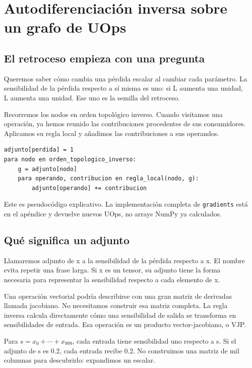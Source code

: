 \documentclass[12pt,a4paper,oneside]{report}
\begin{document}
\chapter{Autodiferenciación inversa sobre un grafo de UOps}
\label{ch:autodiff}
\section{El retroceso empieza con una pregunta}
Queremos saber cómo cambia una pérdida escalar al cambiar cada parámetro. La sensibilidad de la pérdida respecto a sí misma es uno: si L aumenta una unidad, L aumenta una unidad. Ese uno es la semilla del retroceso.

Recorremos los nodos en orden topológico inverso. Cuando visitamos una operación, ya hemos reunido las contribuciones procedentes de sus consumidores. Aplicamos su regla local y añadimos las contribuciones a sus operandos.

\begin{lstlisting}
adjunto[perdida] = 1
para nodo en orden_topologico_inverso:
    g = adjunto[nodo]
    para operando, contribucion en regla_local(nodo, g):
        adjunto[operando] += contribucion
\end{lstlisting}
Este es pseudocódigo explicativo. La implementación completa de \texttt{gradients} está en el apéndice y devuelve nuevos UOps, no arrays NumPy ya calculados.

\section{Qué significa un adjunto}
Llamaremos adjunto de x a la sensibilidad de la pérdida respecto a x. El nombre evita repetir una frase larga. Si x es un tensor, su adjunto tiene la forma necesaria para representar la sensibilidad respecto a cada elemento de x.

Una operación vectorial podría describirse con una gran matriz de derivadas llamada jacobiano. No necesitamos construir esa matriz completa. La regla inversa calcula directamente cómo una sensibilidad de salida se transforma en sensibilidades de entrada. Esa operación es un producto vector-jacobiano, o VJP.

\begin{ejemplo}
Para $s=x_0+\cdots+x_{999}$, cada entrada tiene sensibilidad uno respecto a s. Si el adjunto de s es 0.2, cada entrada recibe 0.2. No construimos una matriz de mil columnas para descubrirlo: expandimos un escalar.

\end{ejemplo}
\end{document}
